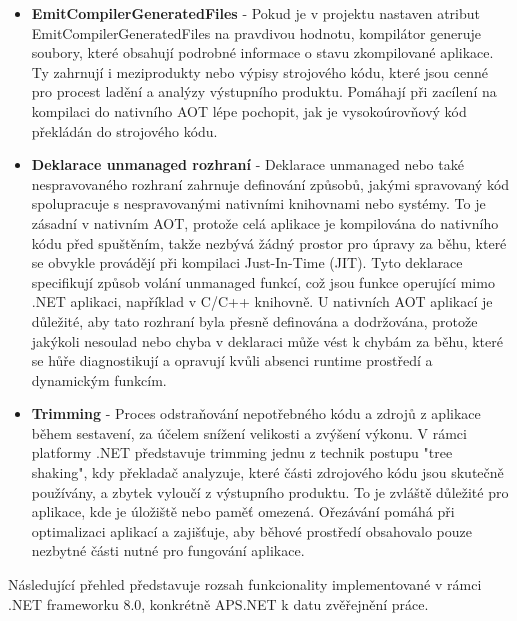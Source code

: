 \begin{itemize}
    \item \textbf{EmitCompilerGeneratedFiles} - Pokud je v projektu nastaven atribut EmitCompilerGeneratedFiles na pravdivou hodnotu, kompilátor generuje soubory, které obsahují podrobné informace o stavu zkompilované aplikace. Ty zahrnují i meziprodukty nebo výpisy strojového kódu, které jsou cenné pro procest ladění a analýzy výstupního produktu. Pomáhají při zacílení na kompilaci do nativního AOT lépe pochopit, jak je vysokoúrovňový kód překládán do strojového kódu.
    \item \textbf{Deklarace unmanaged rozhraní} - Deklarace unmanaged nebo také nespravovaného rozhraní zahrnuje definování způsobů, jakými spravovaný kód spolupracuje s nespravovanými nativními knihovnami nebo systémy. To je zásadní v nativním AOT, protože celá aplikace je kompilována do nativního kódu před spuštěním, takže nezbývá žádný prostor pro úpravy za běhu, které se obvykle provádějí při kompilaci Just-In-Time (JIT). Tyto deklarace specifikují způsob volání unmanaged funkcí, což jsou funkce operující mimo .NET aplikaci, například v C/C++ knihovně.
    U nativních AOT aplikací je důležité, aby tato rozhraní byla přesně definována a dodržována, protože jakýkoli nesoulad nebo chyba v deklaraci může vést k chybám za běhu, které se hůře diagnostikují a opravují kvůli absenci runtime prostředí a dynamickým funkcím.
    \item \textbf{Trimming} - Proces odstraňování nepotřebného kódu a zdrojů z aplikace během sestavení, za účelem snížení velikosti a zvýšení výkonu. V rámci platformy .NET představuje trimming jednu z technik postupu "tree shaking", kdy překladač analyzuje, které části zdrojového kódu jsou skutečně používány, a zbytek vyloučí z výstupního produktu. To je zvláště důležité pro aplikace, kde je úložiště nebo paměť omezená. Ořezávání pomáhá při optimalizaci aplikací a zajišťuje, aby běhové prostředí obsahovalo pouze nezbytné části nutné pro fungování aplikace.
\end{itemize}


Následující přehled představuje rozsah funkcionality implementované v rámci .NET frameworku 8.0, konkrétně APS.NET k datu zvěřejnění práce.

